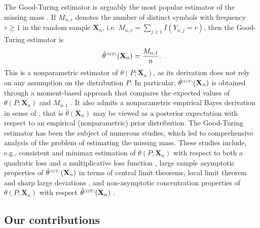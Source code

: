 \documentclass{article}
\newcommand{\1}{\boldsymbol{1}}
\theoremstyle{plain}
\begin{document}
The Good-Turing estimator is arguably the most popular estimator of the missing mass \cite{Goo(53),Rob(56),Rob(68)}. If $M_{n,r}$ denotes the number of distinct symbols with frequency $r\geq1$ in the random sample $\mathbf{X}_{n}$, i.e. $M_{n,r}=\sum_{j\geq 1}I(Y_{n,j}=r)$, then the Good-Turing estimator is
\begin{displaymath}
\hat{\theta}^{\text{\tiny{(GT)}}}(\mathbf{X}_{n})=\frac{M_{n,1}}{n}.
\end{displaymath}
This is a nonparametric estimator of $\theta(P;\mathbf{X}_{n})$, as its derivation does not rely on any assumption on the distribution $P$. In particular, $\hat{\theta}^{\text{\tiny{(GT)}}}(\mathbf{X}_{n})$ is obtained through a moment-based approach that compares the expected values of $\theta(P;\mathbf{X}_{n})$ and $M_{n,1}$ \cite{Goo(53)}. It also admits a nonparametric empirical Bayes derivation in sense of \cite{Rob(56),Rob(64)}, that is $\hat{\theta}(\mathbf{X}_{n})$ may be viewed as a posterior expectation with respect to an empirical (nonparametric) prior distribution. The Good-Turing estimator has been the subject of numerous studies, which led to comprehensive analysis of the problem of estimating the missing mass. These studies include, e.g., consistent and minimax estimation of $\theta(P;\mathbf{X}_{n})$ with respect to both a quadratic loss and a multiplicative loss function \cite{McA(00),Orl(03),Oha(12),Mos(15),Ach(18),Fad(18)}, large sample asymptotic properties of $\hat{\theta}^{\text{\tiny{(GT)}}}(\mathbf{X}_{n})$ in terms of central limit theorems, local limit theorem and sharp large deviations \cite{Est(82),Est(83),Zha(09), Gao13}, and non-asymptotic concentration properties of $\theta(P;\mathbf{X}_{n})$ with respect $\hat{\theta}^{\text{\tiny{(GT)}}}(\mathbf{X}_{n})$ \cite{Rob(68),McA(03), Oha(12), Ben(17),Fad(18)}.

\subsection{Our contributions}
\end{document}
